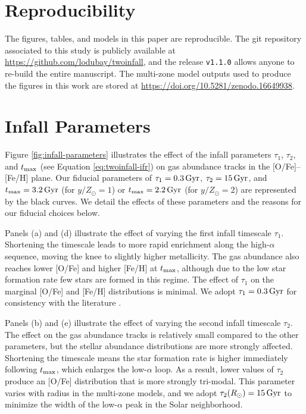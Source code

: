 \documentclass[twocolumn,twocolappendix]{aastex701}
\newcommand{\GitHubURL}{https://github.com/lodubay/twoinfall}
\newcommand{\yZ}[1]{$y/Z_\odot=#1$}
\newcommand{\Gyr}{\,{\rm Gyr}}
\begin{document}
\section{Reproducibility}
\label{app:reproducibility}

The figures, tables, and models in this paper are reproducible. The git repository associated to this study is publicly available at \url{\GitHubURL}, and the release {\tt v1.1.0} allows anyone to re-build the entire manuscript. The multi-zone model outputs used to produce the figures in this work are stored at \url{https://doi.org/10.5281/zenodo.16649938}.


\section{Infall Parameters}
\label{app:infall-parameters}

Figure \ref{fig:infall-parameters} illustrates the effect of the infall parameters $\tau_1$, $\tau_2$, and $t_{\rm max}$ (see Equation \ref{eq:twoinfall-ifr}) on gas abundance tracks in the [O/Fe]--[Fe/H] plane. Our fiducial parameters of $\tau_1=0.3\Gyr$, $\tau_2=15\Gyr$, and $t_{\rm max}=3.2\Gyr$ (for \yZ{1}) or $t_{\rm max}=2.2\Gyr$ (for \yZ{2}) are represented by the black curves. We detail the effects of these parameters and the reasons for our fiducial choices below.

Panels (a) and (d) illustrate the effect of varying the first infall timescale $\tau_1$. Shortening the timescale leads to more rapid enrichment along the high-$\alpha$ sequence, moving the knee to slightly higher metallicity. The gas abundance also reaches lower [O/Fe] and higher [Fe/H] at $t_{\rm max}$, although due to the low star formation rate few stars are formed in this regime. The effect of $\tau_1$ on the marginal [O/Fe] and [Fe/H] distributions is minimal. We adopt $\tau_1=0.3\Gyr$ for consistency with the literature \citep[e.g.,][]{nissen_high-precision_2020,palicio_analytic_2023,hegedus_reconstructing_2025}.

Panels (b) and (e) illustrate the effect of varying the second infall timescale $\tau_2$. The effect on the gas abundance tracks is relatively small compared to the other parameters, but the stellar abundance distributions are more strongly affected. Shortening the timescale means the star formation rate is higher immediately following $t_{\rm max}$, which enlarges the low-$\alpha$ loop. As a result, lower values of $\tau_2$ produce an [O/Fe] distribution that is more strongly tri-modal. This parameter varies with radius in the multi-zone models, and we adopt $\tau_2(R_\odot)=15\Gyr$ to minimize the width of the low-$\alpha$ peak in the Solar neighborhood.
\end{document}
